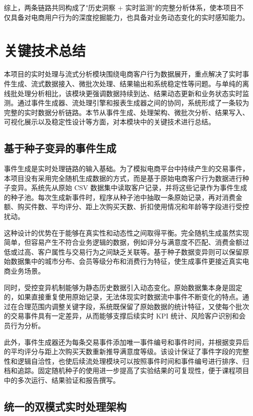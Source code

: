 \documentclass[12pt,hyperref,a4paper,UTF8]{ctexart}
\begin{document}
综上，两条链路共同构成了"历史洞察 + 实时监测"的完整分析体系，使本项目不仅具备对电商用户行为的深度挖掘能力，也具备对业务动态变化的实时感知能力。


\section{关键技术总结}

本项目的实时处理与流式分析模块围绕电商客户行为数据展开，重点解决了实时事件生成、流式数据接入、微批次处理、结果输出和系统稳定性等问题。与单纯的离线批处理分析相比，该模块更强调数据持续到达、结果动态更新和业务状态实时监测。通过事件生成器、流处理引擎和报表生成器之间的协同，系统形成了一条较为完整的实时数据分析链路。本节从事件生成、处理架构、微批次分析、结果写入、可视化展示以及稳定性设计等方面，对本模块中的关键技术进行总结。

\subsection{基于种子变异的事件生成}

事件生成是实时处理链路的输入基础。为了模拟电商平台中持续产生的交易事件，本项目没有采用完全随机生成数据的方式，而是基于原始电商客户行为数据进行种子变异。系统先从原始 CSV 数据集中读取客户记录，并将这些记录作为事件生成的种子池。每次生成新事件时，程序从种子池中抽取一条原始记录，再对消费金额、购买件数、平均评分、距上次购买天数、折扣使用情况和年龄等字段进行受控扰动。

这种设计的优势在于能够在真实性和动态性之间取得平衡。完全随机生成虽然实现简单，但容易产生不符合业务逻辑的数据，例如评分与满意度不匹配、消费金额过低或过高、客户属性与交易行为之间缺乏关联等。基于种子数据变异则可以保留原始数据集中的城市分布、会员等级分布和消费行为特征，使生成事件更接近真实电商业务场景。

同时，受控变异机制能够为静态历史数据引入动态变化。原始数据集本身是固定的，如果直接重复使用原始记录，无法体现实时数据流中事件不断变化的特点。通过在合理范围内调整关键字段，系统既保留了原始数据的统计特征，又使每个批次的交易事件具有一定差异，从而能够支撑后续实时 KPI 统计、风险客户识别和会员行为分析。

此外，事件生成器还为每条交易事件添加唯一事件编号和事件时间，并根据变异后的平均评分与距上次购买天数重新推导满意度等级。该设计保证了事件字段的完整性和逻辑自洽性，也使后续流处理模块可以按照事件时间和事件编号进行排序、归档和追踪。固定随机种子的使用进一步提高了实验结果的可复现性，便于课程项目中的多次运行、结果验证和报告撰写。

\subsection{统一的双模式实时处理架构}
\end{document}
